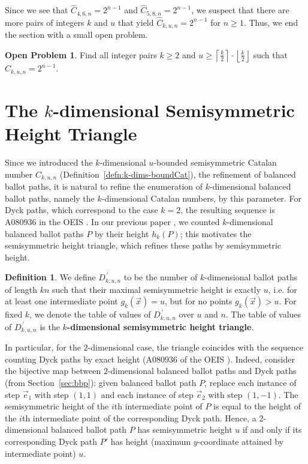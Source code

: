 \documentclass[11pt]{article}
\theoremstyle{remark}
\theoremstyle{definition}
\newtheorem{definition}[theorem]{Definition}
\newtheorem{openproblem}[theorem]{Open Problem}
\begin{document}
Since we see that $\widehat{C}_{4, 6, n} = 2^{n-1}$ and $\widehat{C}_{5, 8, n} = 2^{n-1}$, we suspect that there  are more pairs of integers $k$ and $u$ that yield $\widehat{C}_{k, u, n} = 2^{n-1}$ for $n \geq 1$. Thus, we end the section with a small open problem.
\begin{openproblem}
    Find all integer pairs \( k \geq 2 \) and \( u \geq \left\lceil\frac{k}{2}\right\rceil \cdot \left\lfloor\frac{k}{2}\right\rfloor \) such that \( \widehat{C}_{k, u, n} = 2^{n-1} \).
\end{openproblem}
\section{The \texorpdfstring{$k$}{k}-dimensional Semisymmetric Height Triangle}\label{sec:heighttriangles}
Since we introduced the $k$-dimensional $u$-bounded semisymmetric Catalan number $\widehat{C}_{k, u, n}$ (Definition~\ref{defn:k-dims-boundCat}), the refinement of balanced ballot paths, it is natural to refine the enumeration of $k$-dimensional balanced ballot paths, namely the $k$-dimensional Catalan numbers, by this parameter. For Dyck paths, which correspond to the case $k=2$, the resulting sequence is A080936 in the OEIS \cite{oeis}. In our previous paper \cite{MR5034574}, we counted $k$-dimensional balanced ballot paths $P$ by their height $h_k(P)$; this motivates the semisymmetric height triangle, which refines these paths by semisymmetric height.


\begin{definition} We define $D_{k,u,n}^{\,\prime}$ to be the number of $k$-dimensional ballot paths of length $kn$ such that their maximal semisymmetric height is exactly $u$, i.e. for at least one intermediate point $g_k(\vec{x})=u$, but for no points $g_k(\vec{x}) > u$. For fixed $k$, we denote the table of values of $D_{k, u, n}^{\,\prime}$ over $u$ and $n$. The table of values of $D_{k,u , n}^{\,\prime}$ is the \textbf{$k$-dimensional  semisymmetric height triangle}. \end{definition}
In particular, for the $2$-dimensional case, the triangle coincides with the sequence counting Dyck paths by exact height (A080936 of the OEIS \cite{oeis}). Indeed, consider the bijective map between $2$-dimensional balanced ballot paths and Dyck paths (from Section~\ref{sec:bbp}): given balanced ballot path $P$, replace each instance of step $\vec{e}_1$ with step $(1, 1)$ and each instance of step $\vec{e}_2$ with step $(1, -1)$. The semisymmetric height of the $i$th intermediate point of $P$ is equal to the height of the $i$th intermediate point of the corresponding Dyck path. Hence, a $2$-dimensional balanced ballot path $P$ has semisymmetric height $u$ if and only if its corresponding Dyck path $P'$ has height (maximum $y$-coordinate attained by intermediate point) $u$.
\end{document}
